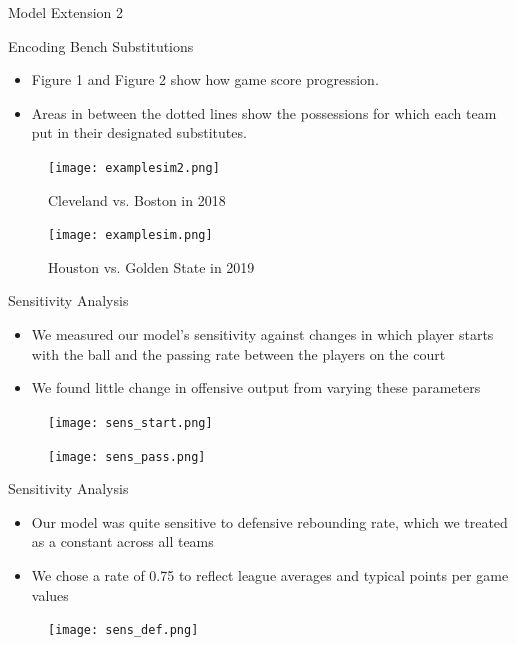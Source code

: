 \documentclass{beamer}
\begin{document}
\begin{frame}{Model Extension 2}
\begin{block}{Encoding Bench Substitutions}
\begin{itemize}
    \item Figure 1 and Figure 2 show how game score progression.
    \item Areas in between the dotted lines show the possessions for which each team put in their designated substitutes.
\end{itemize}
\end{block}
\begin{figure}[!htb]
   \begin{minipage}{0.5\textwidth}
     \centering
     \texttt{[image: examplesim2.png]}
     \caption{Cleveland vs. Boston in 2018}
   \end{minipage}\hfill
   \begin{minipage}{0.5\textwidth}
     \centering
     \texttt{[image: examplesim.png]}
     \caption{Houston vs. Golden State in 2019}
   \end{minipage}
\end{figure}
\end{frame}



\begin{frame}{Sensitivity Analysis}

\begin{itemize}
    \item We measured our model's sensitivity against changes in which player starts with the ball and the passing rate between the players on the court
    \item We found little change in offensive output from varying these parameters
    
\end{itemize}

\begin{figure}[!htb]
   \begin{minipage}{0.5\textwidth}
     \centering
     \texttt{[image: sens\_start.png]}
   \end{minipage}\hfill
   \begin{minipage}{0.5\textwidth}
     \centering
     \texttt{[image: sens\_pass.png]}
   \end{minipage}
\end{figure}
\end{frame}

\begin{frame}{Sensitivity Analysis}

\begin{itemize}
    \item Our model was quite sensitive to defensive rebounding rate, which we treated as a constant across all teams
    \item We chose a rate of 0.75 to reflect league averages and typical points per game values
    
\end{itemize}

\begin{figure}
\texttt{[image: sens\_def.png]}
\end{figure}
\end{frame}
\end{document}
